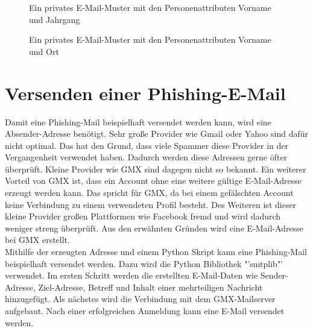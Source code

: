 			\begin{figure}[h!]
				\label{img:VornameJahrgang}
				\caption{Ein privates E-Mail-Muster mit den Personenattributen Vorname und Jahrgang}
			\end{figure}
		
			\begin{figure}[h!]
				\caption{Ein privates E-Mail-Muster mit den Personenattributen Vorname und Ort}
			\end{figure}
		
		\FloatBarrier
\section{Versenden einer Phishing-E-Mail}
Damit eine Phishing-Mail beispielhaft versendet werden kann, wird eine Absender-Adresse benötigt. Sehr große Provider wie Gmail oder Yahoo sind dafür nicht optimal. Das hat den Grund, dass viele Spammer diese Provider in der Vergangenheit verwendet haben. Dadurch werden diese Adressen gerne öfter überprüft. Kleine Provider wie GMX sind dagegen nicht so bekannt. Ein weiterer Vorteil von GMX ist, dass ein Account ohne eine weitere gültige E-Mail-Adresse erzeugt werden kann. Das spricht für GMX, da bei einem gefälschten Account keine Verbindung zu einem verwendeten Profil besteht. Des Weiteren ist dieser kleine Provider großen Plattformen wie Facebook fremd und wird dadurch weniger streng überprüft. Aus den erwähnten Gründen wird eine E-Mail-Adresse bei GMX erstellt.\cite{Bazzell}\\
Mithilfe der erzeugten Adresse und einem Python Skript kann eine Phishing-Mail beispielhaft versendet werden. Dazu wird die Python Bibliothek "'smtplib"' verwendet. Im ersten Schritt werden die erstellten E-Mail-Daten wie Sender-Adresse, Ziel-Adresse, Betreff und Inhalt einer mehrteiligen Nachricht hinzugefügt. Als nächstes wird die Verbindung mit dem GMX-Mailserver aufgebaut. Nach einer erfolgreichen Anmeldung kann eine E-Mail versendet werden. 










	